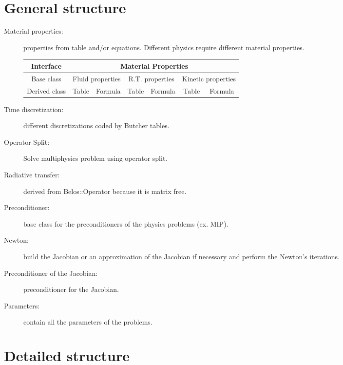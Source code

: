 \section{General structure}
\begin{description}
  \item[Material properties:] properties from table and/or equations.
    Different physics require different material properties.
    \begin{table}[H]
      \centering
      \begin{tabular}{|c|c|c|c|c|c|c|}
        \hline
        Interface & \multicolumn{6}{c|}{Material Properties} \\
        \hline
        Base class & \multicolumn{2}{c|}{Fluid properties} &
      \multicolumn{2}{c|}{R.T. properties} & \multicolumn{2}{c|}{Kinetic properties}
        \\
        \hline
        Derived class & Table & Formula & Table & Formula & Table & Formula \\
        \hline
      \end{tabular}
    \end{table}
  \item[Time discretization:] different discretizations coded by Butcher
    tables.
  \item[Operator Split:] Solve multiphysics problem using operator split.
  \item[Radiative transfer:] derived from Belos::Operator because it is matrix
    free.
  \item[Preconditioner:] base class for the preconditioners of the physics
    problems (ex. MIP).
  \item[Newton:] build the Jacobian or an approximation of the Jacobian if
    necessary and perform the Newton's iterations.
  \item[Preconditioner of the Jacobian:] preconditioner for the Jacobian.
  \item[Parameters:] contain all the parameters of the problems.
\end{description}

\section{Detailed structure}

